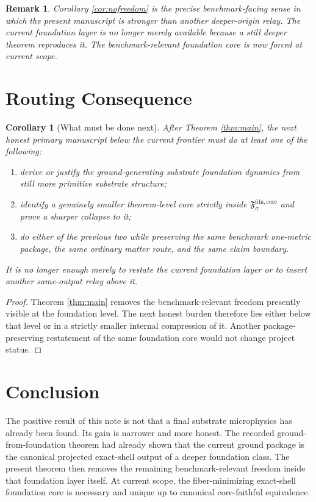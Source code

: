 \documentclass[11pt]{article}
\newcommand{\FoundCore}[1]{\mathfrak F_{#1}^{\mathrm{fdn,core}}}
\newtheorem{remark}{Remark}
\newtheorem{corollary}{Corollary}
\begin{document}
\begin{remark}
Corollary \ref{cor:nofreedom} is the precise benchmark-facing sense in which the present manuscript is stronger than another deeper-origin relay. The current foundation layer is no longer merely available because a still deeper theorem reproduces it. The benchmark-relevant foundation core is now forced at current scope.
\end{remark}

\section{Routing Consequence}

\begin{corollary}[What must be done next]
\label{cor:next}
After Theorem \ref{thm:main}, the next honest primary manuscript below the current frontier must do at least one of the following:
\begin{enumerate}
    \item derive or justify the ground-generating substrate foundation dynamics from still more primitive substrate structure;
    \item identify a genuinely smaller theorem-level core strictly inside \(\FoundCore{\sigma}\) and prove a sharper collapse to it;
    \item do either of the previous two while preserving the same benchmark one-metric package, the same ordinary matter route, and the same claim boundary.
\end{enumerate}
It is no longer enough merely to restate the current foundation layer or to insert another same-output relay above it.
\end{corollary}

\begin{proof}
Theorem \ref{thm:main} removes the benchmark-relevant freedom presently visible at the foundation level. The next honest burden therefore lies either below that level or in a strictly smaller internal compression of it. Another package-preserving restatement of the same foundation core would not change project status.
\end{proof}

\section{Conclusion}

The positive result of this note is not that a final substrate microphysics has already been found. Its gain is narrower and more honest. The recorded ground-from-foundation theorem had already shown that the current ground package is the canonical projected exact-shell output of a deeper foundation class. The present theorem then removes the remaining benchmark-relevant freedom inside that foundation layer itself. At current scope, the fiber-minimizing exact-shell foundation core is necessary and unique up to canonical core-faithful equivalence.
\end{document}
